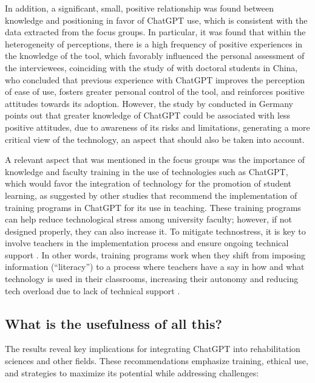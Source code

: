 \documentclass[english]{textolivre}
\begin{document}
In addition, a significant, small, positive relationship was found between knowledge and positioning in favor of ChatGPT use, which is consistent with the data extracted from the focus groups. In particular, it was found that within the heterogeneity of perceptions, there is a high frequency of positive experiences in the knowledge of the tool, which favorably influenced the personal assessment of the interviewees, coinciding with the study of \textcite{zou2023acceptance} with doctoral students in China, who concluded that previous experience with ChatGPT improves the perception of ease of use, fosters greater personal control of the tool, and reinforces positive attitudes towards its adoption. However, the study by \textcite{kohler2024highereducation} conducted in Germany points out that greater knowledge of ChatGPT could be associated with less positive attitudes, due to awareness of its risks and limitations, generating a more critical view of the technology, an aspect that should also be taken into account.

A relevant aspect that was mentioned in the focus groups was the importance of knowledge and faculty training in the use of technologies such as ChatGPT, which would favor the integration of technology for the promotion of student learning, as suggested by other studies \cite{montenegro2023systematic,sok2024opportunities} that recommend the implementation of training programs in ChatGPT for its use in teaching. These training programs can help reduce technological stress among university faculty; however, if not designed properly, they can also increase it. To mitigate technostress, it is key to involve teachers in the implementation process and ensure ongoing technical support \cite{li2021technostress}. In other words, training programs work when they shift from imposing information (“literacy”) to a process where teachers have a say in how and what technology is used in their classrooms, increasing their autonomy and reducing tech overload due to lack of technical support \cite{li2021smartservice}.

\subsection{What is the usefulness of all this?}\label{sec-secoes}
The results reveal key implications for integrating ChatGPT into rehabilitation sciences and other fields. These recommendations emphasize training, ethical use, and strategies to maximize its potential while addressing challenges:
\end{document}
